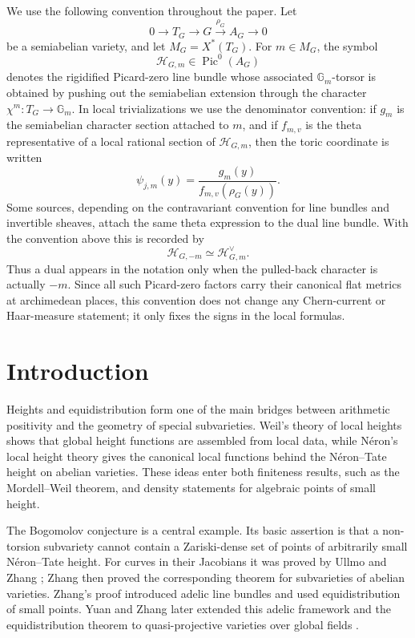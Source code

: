 \documentclass[10pt,a4paper]{amsart}
\theoremstyle{plain}
\theoremstyle{plain}
\numberwithin{equation}{section}
\begin{document}
We use the following convention throughout the paper.  Let
\[
0\longrightarrow T_G\longrightarrow G\xrightarrow{\rho_G}A_G\longrightarrow0
\]
be a semiabelian variety, and let \(M_G=X^*(T_G)\).  For
\(m\in M_G\), the symbol
\[
\mathcal H_{G,m}\in\operatorname{Pic}^0(A_G)
\]
denotes the rigidified Picard-zero line bundle whose associated
\(\mathbb G_m\)-torsor is obtained by pushing out the semiabelian extension
through the character \(\chi^m:T_G\to\mathbb G_m\).  In local
trivializations we use the denominator convention: if \(g_m\) is the
semiabelian character section attached to \(m\), and if \(f_{m,v}\) is the
theta representative of a local rational section of \(\mathcal H_{G,m}\),
then the toric coordinate is written
\[
\psi_{j,m}(y)=\frac{g_m(y)}{f_{m,v}(\rho_G(y))}.
\]
Some sources, depending on the contravariant convention for line bundles and
invertible sheaves, attach the same theta expression to the dual line bundle.
With the convention above this is recorded by
\[
\mathcal H_{G,-m}\simeq\mathcal H_{G,m}^{\vee}.
\]
Thus a dual appears in the notation only when the pulled-back character is
actually \(-m\).  Since all such Picard-zero factors carry their canonical
flat metrics at archimedean places, this convention does not change any
Chern-current or Haar-measure statement; it only fixes the signs in the local
formulas.

\begingroup
\small
\tableofcontents
\endgroup
\clearpage
\section{Introduction}

Heights and equidistribution form one of the main bridges between arithmetic
positivity and the geometry of special subvarieties.  Weil's theory of local
heights \cite{We} shows that global height functions are assembled from local
data, while N\'eron's local height theory \cite{Ne} gives the canonical local
functions behind the N\'eron--Tate height on abelian varieties.  These ideas
enter both finiteness results, such as the Mordell--Weil theorem, and
density statements for algebraic points of small height.

The Bogomolov conjecture is a central example.  Its basic assertion is that a
non-torsion subvariety cannot contain a Zariski-dense set of points of
arbitrarily small N\'eron--Tate height.  For curves in their Jacobians it was
proved by Ullmo \cite{Ull} and Zhang \cite{Zha}; Zhang then proved the
corresponding theorem for subvarieties of abelian varieties.  Zhang's proof introduced adelic line
bundles and used equidistribution of small points.  Yuan and Zhang later
extended this adelic framework and the equidistribution theorem to
quasi-projective varieties over global fields \cite{YZ}.
\end{document}
